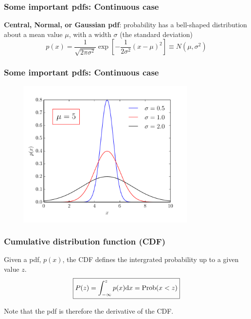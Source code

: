 \begin{frame}

\frametitle{Some important pdfs: Continuous case}
\label{someimportantpdfs:continuouscase}

\textbf{Central, Normal, or Gaussian pdf}: probability has a bell-shaped distribution about a mean value
$\mu$, with a width $\sigma$ (the standard deviation)
\[
\boxed{p(x) = \frac{1}{\sqrt{2\pi\sigma^2}}\exp{\left[-\frac{1}{2\sigma^2}(x-\mu)^2 \right]} \equiv N(\mu,\sigma^2)}
\]

\end{frame}

\begin{frame}

\frametitle{Some important pdfs: Continuous case}
\label{someimportantpdfs:continuouscase}

\begin{figure}[htbp]
\centering
\includegraphics[keepaspectratio,width=\textwidth,height=210pt]{figures/gaussian.pdf}
\label{gaussian}
\end{figure}

\end{frame}

\begin{frame}

\frametitle{Cumulative distribution function (CDF)}
\label{cumulativedistributionfunctioncdf}

Given a pdf, $p(x)$, the CDF defines the intergrated probability up to a given value $z$.
\[
\boxed{P(z) = \int_{-\infty}^{z} p(x) {\rm d}x = \text{Prob}(x<z)}
\]

Note that the pdf is therefore the derivative of the CDF.

\end{frame}

